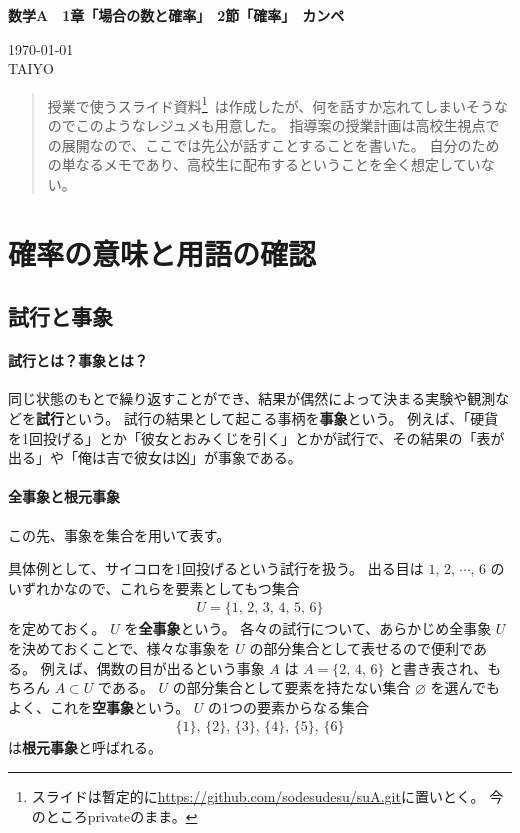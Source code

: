 \documentclass[12pt]{ltjsarticle}\usepackage{ifthen}\newcounter{enlarge}\setcounter{enlarge}{1}
\newcommand{\LS}[2]{\ifthenelse{\value{enlarge}=2 \OR \value{enlarge}=3}{#1}{#2}}
\newcommand{\LO}[1]{\LS{#1}{\relax}}
\begin{document}
{\Large%
\noindent
\textbf{%
数学A　1章「場合の数と確率」　2節「確率」　カンペ
\LO{\\ \color{teal} 〈拡大版〉}}
}

\begin{flushleft}
\today \\
TAIYO
\end{flushleft}

\begin{quotation}
授業で使うスライド資料\footnote{%
  スライドは暫定的に\url{https://github.com/sodesudesu/suA.git}に置いとく。
  今のところprivateのまま。
}\
は作成したが、何を話すか忘れてしまいそうなのでこのようなレジュメも用意した。
指導案の授業計画は高校生視点での展開なので、ここでは先公が話すことすることを書いた。
自分のための単なるメモであり、高校生に配布するということを全く想定していない。
\end{quotation}

\section{確率の意味と用語の確認}

\subsection{試行と事象} \label{ss:1.1}

\paragraph{試行とは？事象とは？}

同じ状態のもとで繰り返すことができ、結果が偶然によって決まる実験や観測などを\textbf{試行}という。
試行の結果として起こる事柄を\textbf{事象}という。
例えば、「硬貨を1回投げる」とか「彼女とおみくじを引く」とかが試行で、その結果の「表が出る」や「俺は吉で彼女は凶」が事象である。

\paragraph{全事象と根元事象}

この先、事象を集合を用いて表す。

具体例として、サイコロを1回投げるという試行を扱う。
出る目は $1,\, 2,\, \cdots ,\, 6$ のいずれかなので、これらを要素としてもつ集合
\begin{align}
  U = \{ 1,\, 2,\, 3,\, 4,\, 5,\, 6 \} \label{eq:1.1}
\end{align}
を定めておく。
$U$ を\textbf{全事象}という。
各々の試行について、あらかじめ全事象 $U$ を決めておくことで、様々な事象を $U$ の部分集合として表せるので便利である。
例えば、偶数の目が出るという事象 $A$ は $A = \{ 2,\, 4,\, 6 \}$ と書き表され、もちろん $A \subset U$ である。
$U$ の部分集合として要素を持たない集合 $\varnothing$ を選んでもよく、これを\textbf{空事象}という。
$U$ の1つの要素からなる集合
\begin{align}
  \{ 1\},\, \{2\},\, \{3\},\, \{4\},\, \{5\},\, \{6\} \label{eq:1.2}
\end{align}
は\textbf{根元事象}と呼ばれる。
\end{document}
